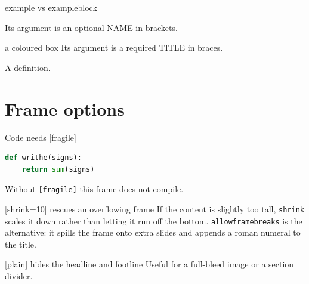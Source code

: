 \documentclass[aspectratio=169,11pt]{beamer}
\begin{document}
\begin{frame}{example vs exampleblock}
    \begin{example}
        Its argument is an optional NAME in brackets.
    \end{example}
    \begin{exampleblock}{a coloured box}
        Its argument is a required TITLE in braces.
    \end{exampleblock}
    \begin{definition}
        A definition.
    \end{definition}
\end{frame}


\section{Frame options}

\begin{frame}[fragile]{Code needs [fragile]}
\begin{lstlisting}[language=Python, basicstyle=\ttfamily\small,
                   frame=single, showstringspaces=false]
def writhe(signs):
    return sum(signs)
\end{lstlisting}
    Without \texttt{[fragile]} this frame does not compile.
\end{frame}

\begin{frame}[shrink=10]{[shrink=10] rescues an overflowing frame}
    If the content is slightly too tall, \texttt{shrink} scales it down
    rather than letting it run off the bottom. \texttt{allowframebreaks}
    is the alternative: it spills the frame onto extra slides and appends
    a roman numeral to the title.
\end{frame}

\begin{frame}[plain]{[plain] hides the headline and footline}
    Useful for a full-bleed image or a section divider.
\end{frame}
\end{document}
